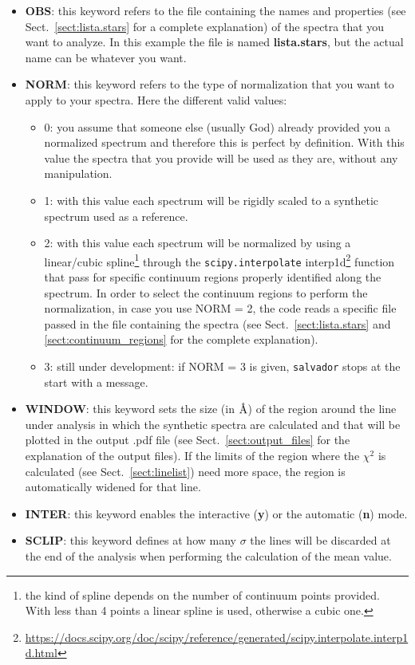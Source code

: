 \documentclass[modern]{aastex701}
\newcommand{\angstrom}{\mbox{\normalfont\AA}}
\begin{document}
\begin{itemize}
    \item {\bf OBS}: this keyword refers to the file containing the names and properties (see Sect.~\ref{sect:lista.stars} for a complete explanation) of the spectra that you want to analyze. In this example the file is named \textbf{lista.stars}, but the actual name can be whatever you want.
    \item {\bf NORM}: this keyword refers to the type of normalization that you want to apply to your spectra. Here the different valid values:
        \begin{itemize}
            \item 0: you assume that someone else (usually God) already provided you a normalized spectrum and therefore this is perfect by definition. With this value the spectra that you provide will be used as they are, without any manipulation.
            \item 1: with this value each spectrum will be rigidly scaled to a synthetic spectrum used as a reference.  
            \item 2: with this value each spectrum will be normalized by using a linear/cubic spline\footnote{the kind of spline depends on the number of continuum points provided. With less than 4 points a linear spline is used, otherwise a cubic one.} through the \texttt{scipy.interpolate} interp1d\footnote{\url{https://docs.scipy.org/doc/scipy/reference/generated/scipy.interpolate.interp1d.html}} function that pass for specific continuum regions properly identified along the spectrum. In order to select the continuum regions to perform the normalization, in case you use NORM = 2, the code reads a specific file passed in the file containing the spectra (see Sect.~\ref{sect:lista.stars} and \ref{sect:continuum_regions} for the complete explanation).  
            \item 3: still under development: if NORM = 3 is given, \texttt{salvador} stops at the start with a message.
        \end{itemize}
    \item {\bf WINDOW}: this keyword sets the size (in $\angstrom$) of the region around the line under analysis in which the synthetic spectra are calculated and that will be plotted in the output .pdf file (see Sect.~\ref{sect:output_files} for the explanation of the output files). If the limits of the region where the $\chi^2$ is calculated (see Sect.~\ref{sect:linelist}) need more space, the region is automatically widened for that line.
    \item {\bf INTER}: this keyword enables the interactive ({\bf y}) or the automatic ({\bf n}) mode. 
    \item {\bf SCLIP}: this keyword defines at how many $\sigma$ the lines will be discarded at the end of the analysis when performing the calculation of the mean value. 
\end{itemize}
\end{document}
